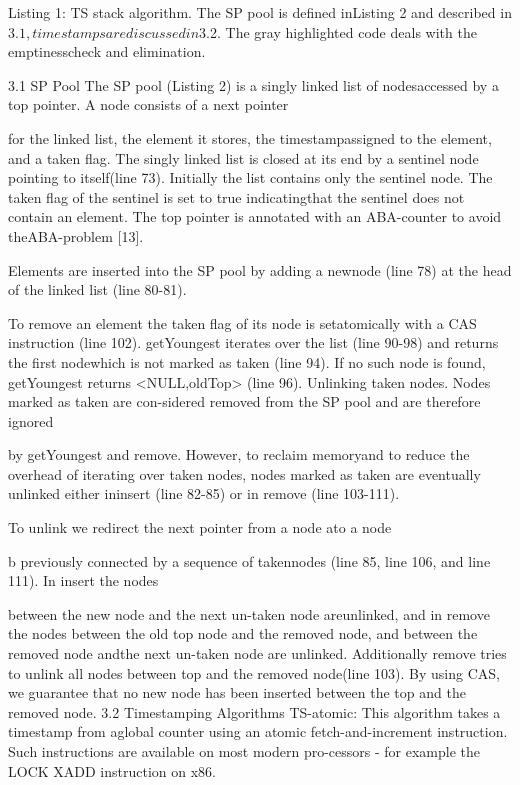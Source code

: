 Listing 1: TS stack algorithm. The SP pool is defined inListing 2 and described in $3.1, timestamps are discussed
in $3.2. The gray highlighted code deals with the emptinesscheck and elimination.

3.1 SP Pool
The SP pool (Listing 2) is a singly linked list of nodesaccessed by a top pointer. A node consists of a next pointer

for the linked list, the element it stores, the timestampassigned to the element, and a taken flag. The singly linked
list is closed at its end by a sentinel node pointing to itself(line 73). Initially the list contains only the sentinel node.
The taken flag of the sentinel is set to true indicatingthat the sentinel does not contain an element. The top
pointer is annotated with an ABA-counter to avoid theABA-problem [13].

Elements are inserted into the SP pool by adding a newnode (line 78) at the head of the linked list (line 80-81).

To remove an element the taken flag of its node is setatomically with a CAS instruction (line 102). getYoungest
iterates over the list (line 90-98) and returns the first nodewhich is not marked as taken (line 94). If no such node is
found, getYoungest returns <NULL,oldTop> (line 96).
Unlinking taken nodes. Nodes marked as taken are con-sidered removed from the SP pool and are therefore ignored

by getYoungest and remove. However, to reclaim memoryand to reduce the overhead of iterating over taken nodes,
nodes marked as taken are eventually unlinked either ininsert (line 82-85) or in remove (line 103-111).

To unlink we redirect the next pointer from a node ato a node

b previously connected by a sequence of takennodes (line 85, line 106, and line 111). In insert the nodes

between the new node and the next un-taken node areunlinked, and in remove the nodes between the old top node
and the removed node, and between the removed node andthe next un-taken node are unlinked. Additionally remove
tries to unlink all nodes between top and the removed node(line 103). By using CAS, we guarantee that no new node has
been inserted between the top and the removed node.
3.2 Timestamping Algorithms
TS-atomic: This algorithm takes a timestamp from aglobal counter using an atomic fetch-and-increment instruction. Such instructions are available on most modern pro-cessors - for example the LOCK XADD instruction on x86.

